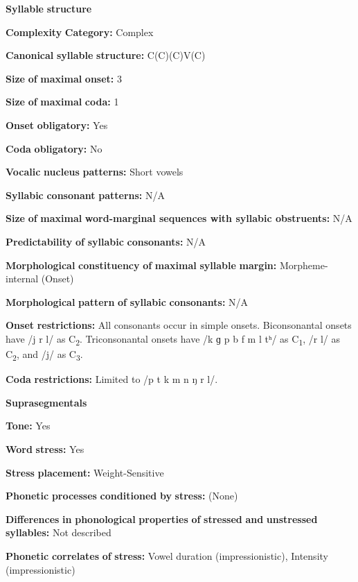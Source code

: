 \textbf{Syllable} \textbf{structure}

\textbf{Complexity} \textbf{Category:} Complex

\textbf{Canonical} \textbf{syllable} \textbf{structure:} C(C)(C)V(C) \citep[30-32]{Plaisier2007}

\textbf{Size} \textbf{of} \textbf{maximal} \textbf{onset:} 3

\textbf{Size} \textbf{of} \textbf{maximal} \textbf{coda:} 1

\textbf{Onset} \textbf{obligatory:} Yes

\textbf{Coda} \textbf{obligatory:} No

\textbf{Vocalic} \textbf{nucleus} \textbf{patterns:} Short vowels

\textbf{Syllabic} \textbf{consonant} \textbf{patterns:} N/A

\textbf{Size} \textbf{of} \textbf{maximal} \textbf{word{}-marginal sequences with syllabic obstruents:} N/A

\textbf{Predictability} \textbf{of} \textbf{syllabic} \textbf{consonants:} N/A

\textbf{Morphological} \textbf{constituency} \textbf{of} \textbf{maximal} \textbf{syllable} \textbf{margin:} Morpheme-internal (Onset)

\textbf{Morphological} \textbf{pattern} \textbf{of} \textbf{syllabic} \textbf{consonants:} N/A

\textbf{Onset} \textbf{restrictions:} All consonants occur in simple onsets. Biconsonantal onsets have /j r l/ as C\textsubscript{2}. Triconsonantal onsets have /k ɡ p b f m l tʰ/ as C\textsubscript{1}, /r l/ as C\textsubscript{2}, and /j/ as C\textsubscript{3}.

\textbf{Coda} \textbf{restrictions:} Limited to /p t k m n ŋ r l/.

\textbf{Suprasegmentals}

\textbf{Tone:} Yes

\textbf{Word} \textbf{stress:} Yes

\textbf{Stress} \textbf{placement:} Weight-Sensitive

\textbf{Phonetic} \textbf{processes} \textbf{conditioned} \textbf{by} \textbf{stress:} (None)

\textbf{Differences} \textbf{in} \textbf{phonological} \textbf{properties} \textbf{of} \textbf{stressed} \textbf{and} \textbf{unstressed} \textbf{syllables:} Not described

\textbf{Phonetic} \textbf{correlates} \textbf{of} \textbf{stress:} Vowel duration (impressionistic), Intensity (impressionistic)

